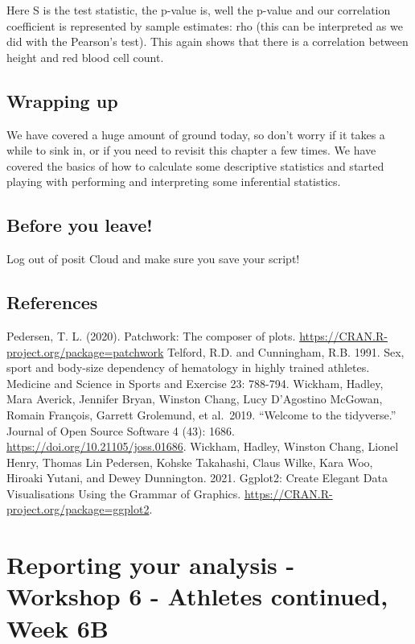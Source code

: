 \documentclass[
]{book}
\begin{document}
Here S is the test statistic, the p-value is, well the p-value and our correlation coefficient is represented by sample estimates: rho (this can be interpreted as we did with the Pearson's test). This again shows that there is a correlation between height and red blood cell count.

\hypertarget{wrapping-up-1}{%
\section{Wrapping up}\label{wrapping-up-1}}

We have covered a huge amount of ground today, so don't worry if it takes a while to sink in, or if you need to revisit this chapter a few times. We have covered the basics of how to calculate some descriptive statistics and started playing with performing and interpreting some inferential statistics.

\hypertarget{before-you-leave-8}{%
\section{Before you leave!}\label{before-you-leave-8}}

Log out of posit Cloud and make sure you save your script!

\hypertarget{references-9}{%
\section{References}\label{references-9}}

Pedersen, T. L. (2020). Patchwork: The composer of plots. \url{https://CRAN.R-project.org/package=patchwork}
Telford, R.D. and Cunningham, R.B. 1991. Sex, sport and body-size dependency of hematology in highly trained athletes. Medicine and Science in Sports and Exercise 23: 788-794.
Wickham, Hadley, Mara Averick, Jennifer Bryan, Winston Chang, Lucy D'Agostino McGowan, Romain François, Garrett Grolemund, et al.~2019. ``Welcome to the tidyverse.'' Journal of Open Source Software 4 (43): 1686. \url{https://doi.org/10.21105/joss.01686}.
Wickham, Hadley, Winston Chang, Lionel Henry, Thomas Lin Pedersen, Kohske Takahashi, Claus Wilke, Kara Woo, Hiroaki Yutani, and Dewey Dunnington. 2021. Ggplot2: Create Elegant Data Visualisations Using the Grammar of Graphics. \url{https://CRAN.R-project.org/package=ggplot2}.

\hypertarget{reporting}{%
\chapter{Reporting your analysis - Workshop 6 - Athletes continued, Week 6B}\label{reporting}}
\end{document}
